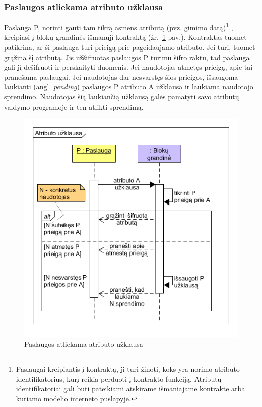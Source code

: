 \subsubsection{Paslaugos atliekama atributo užklausa} \label{BCIDM:askForAttribute}

Paslauga P, norinti gauti tam tikrą asmens atributą (pvz. gimimo datą)\footnote{ Paslaugai kreipiantis į kontraktą, ji turi žinoti, koks yra norimo atributo identifikatorius, kurį reikia perduoti į kontrakto funkciją. 
Atributų identifikatoriai gali būti pateikiami atskirame išmaniajame kontrakte arba kuriamo modelio interneto puslapyje.}
, kreipiasi į blokų grandinės išmanųjį kontraktą (žr.\hypertarget{fig:askForAttributeSequence}{~\ref{fig:askForAttributeSequence} pav.}).
Kontraktas tuomet patikrina, ar ši paslauga turi prieigą prie pageidaujamo atributo. Jei turi, tuomet grąžina šį atributą. Jis
užšifruotas paslaugos P turimu šifro raktu, tad paslauga gali jį dešifruoti ir perskaityti duomenis. Jei
naudotojas atmetęs prieigą, apie tai pranešama paslaugai. Jei naudotojas dar nesvarstęs šios prieigos, išsaugoma laukianti
(angl. \textit{pending}) paslaugos P atributo A užklausa ir laukiama naudotojo sprendimo. Naudotojas šią laukiančią užklausą galės pamatyti savo 
atributų valdymo programoje ir ten atlikti sprendimą.

\begin{figure}[h]
    \centering
    \includegraphics[scale=0.7]{img/askForAttributeSequence}
    \caption{Paslaugos atliekama atributo užklausa}
    \label{fig:askForAttributeSequence}
\end{figure}

